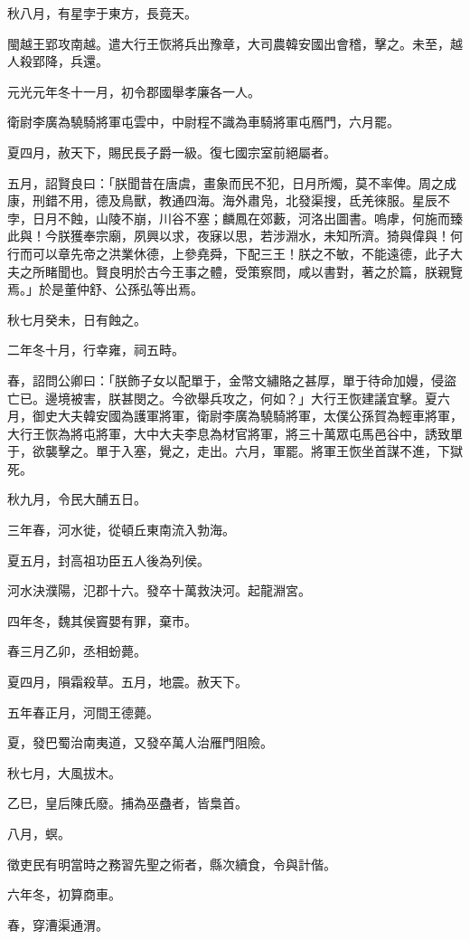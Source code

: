 \begin{pinyinscope}
秋八月，有星孛于東方，長竟天。

閩越王郢攻南越。遣大行王恢將兵出豫章，大司農韓安國出會稽，擊之。未至，越人殺郢降，兵還。

元光元年冬十一月，初令郡國舉孝廉各一人。

衛尉李廣為驍騎將軍屯雲中，中尉程不識為車騎將軍屯鴈門，六月罷。

夏四月，赦天下，賜民長子爵一級。復七國宗室前絕屬者。

五月，詔賢良曰：「朕聞昔在唐虞，畫象而民不犯，日月所燭，莫不率俾。周之成康，刑錯不用，德及鳥獸，教通四海。海外肅凫，北發渠搜，氐羌徠服。星辰不孛，日月不蝕，山陵不崩，川谷不塞；麟鳳在郊藪，河洛出圖書。嗚虖，何施而臻此與！今朕獲奉宗廟，夙興以求，夜寐以思，若涉淵水，未知所濟。猗與偉與！何行而可以章先帝之洪業休德，上參堯舜，下配三王！朕之不敏，不能遠德，此子大夫之所睹聞也。賢良明於古今王事之體，受策察問，咸以書對，著之於篇，朕親覽焉。」於是董仲舒、公孫弘等出焉。

秋七月癸未，日有蝕之。

二年冬十月，行幸雍，祠五畤。

春，詔問公卿曰：「朕飾子女以配單于，金幣文繡賂之甚厚，單于待命加嫚，侵盜亡已。邊境被害，朕甚閔之。今欲舉兵攻之，何如？」大行王恢建議宜擊。夏六月，御史大夫韓安國為護軍將軍，衛尉李廣為驍騎將軍，太僕公孫賀為輕車將軍，大行王恢為將屯將軍，大中大夫李息為材官將軍，將三十萬眾屯馬邑谷中，誘致單于，欲襲擊之。單于入塞，覺之，走出。六月，軍罷。將軍王恢坐首謀不進，下獄死。

秋九月，令民大酺五日。

三年春，河水徙，從頓丘東南流入勃海。

夏五月，封高祖功臣五人後為列侯。

河水決濮陽，氾郡十六。發卒十萬救決河。起龍淵宮。

四年冬，魏其侯竇嬰有罪，棄巿。

春三月乙卯，丞相蚡薨。

夏四月，隕霜殺草。五月，地震。赦天下。

五年春正月，河間王德薨。

夏，發巴蜀治南夷道，又發卒萬人治雁門阻險。

秋七月，大風拔木。

乙巳，皇后陳氏廢。捕為巫蠱者，皆梟首。

八月，螟。

徵吏民有明當時之務習先聖之術者，縣次續食，令與計偕。

六年冬，初算商車。

春，穿漕渠通渭。


\end{pinyinscope}
